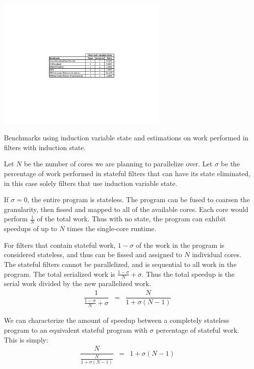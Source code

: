 \begin{table}[t]
\includegraphics[width=3.3in]{figures/induction-benchmarks.pdf}
\caption{Benchmarks using induction variable state and estimations on work performed in filters with induction state.\protect\label{fig:benchmarks}}
\end{table}

Let $N$ be the number of cores we are planning to parallelize over.  Let $\sigma$ be the percentage of work performed in stateful filters that can have its state eliminated, in this case solely filters that use induction variable state.  

If $\sigma = 0$, the entire program is stateless.  The program can be fused to coarsen the granularity, then fissed and mapped to all of the available cores.  Each core would perform $\frac{1}{N}$ of the total work.  Thus with no state, the program can exhibit speedups of up to $N$ times the single-core runtime.

For filters that contain stateful work, $1-\sigma$ of the work in the program is considered stateless, and thus can be fissed and assigned to $N$ individual cores.  The stateful filters cannot be parallelized, and is sequential to all work in the program.  The total serialized work is $\frac{1-\sigma}{N} + \sigma$.  Thus the total speedup is the serial work divided by the new parallelized work.  
\begin{eqnarray*}
\dfrac{1}{\frac{1-\sigma}{N} + \sigma} &=& \dfrac{N}{1 + \sigma(N-1)}
\end{eqnarray*}

We can characterize the amount of speedup between a completely stateless program to an equivalent stateful program with $\sigma$ percentage of stateful work.  This is simply:
\begin{eqnarray*}
\dfrac{N}{\frac{N}{1 + \sigma(N-1)}} &=& 1 + \sigma(N-1)
\end{eqnarray*}

